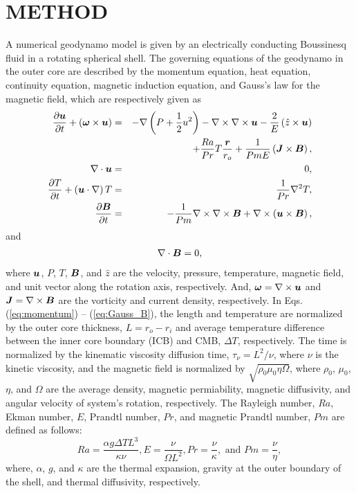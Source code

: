 \section{METHOD}
%
A numerical geodynamo model is given by an electrically conducting Boussinesq fluid in a rotating spherical shell. The governing equations of the geodynamo in the outer core are described by the momentum equation, heat equation, continuity equation, magnetic induction equation, and Gauss's law for the magnetic field, which are respectively given as
%
\begin{eqnarray}
\frac{\partial \bvec{u}}{\partial t} + \left(\bvec{\omega} \times \bvec{u}\right)
 & = & - \nabla \left(P+\frac{1}{2}u^{2} \right) - \nabla \times \nabla \times \bvec{u}
      - \frac{2}{E} \left(\hat{z} \times \bvec{u} \right)
\nonumber \\
 & & + \frac{Ra}{Pr} T \frac{\bvec{r}}{r_{o}}
        + \frac{1}{Pm E} \left(\bvec{J} \times \bvec{B} \right),
\label{eq:momentum} \\
%
\nabla \cdot \bvec{u} & = & 0, 
\label{eq:conservation} \\
%
\frac{\partial T}{\partial t} + \left(\bvec{u} \cdot \nabla \right) T
 & = & \frac{1}{Pr} \nabla^{2} T,
\label{eq:heat} \\
%
 \frac{\partial \bvec{B}}{\partial t}
 & = & -\frac{1}{Pm}  \nabla \times \nabla \times \bvec{B}
       + \nabla \times \left(\bvec{u} \times \bvec{B} \right),
\label{eq:induction}
\end{eqnarray}
%
and
\begin{eqnarray}
\nabla \cdot \mbox{\boldmath$B$} = 0,
\label{eq:Gauss_B}
\end{eqnarray}
%
where $\mbox{\boldmath$u$}$, $P$, $T$, $\mbox{\boldmath$B$}$, and $\hat{z}$ are the velocity, pressure, temperature, magnetic field, and unit vector along the rotation axis, respectively. And, $\mbox{\boldmath$\omega$} = \nabla \times \mbox{\boldmath$u$}$ and $\mbox{\boldmath$J$} = \nabla \times \mbox{\boldmath$B$}$ are the vorticity and current density, respectively.
In Eqs. (\ref{eq:momentum}) – (\ref{eq:Gauss_B}), the length and temperature are normalized by the outer core thickness, $L = r_{o} - r_{i}$ and average temperature difference between the inner core boundary (ICB) and CMB, $\Delta T$, respectively. The time is normalized by the kinematic viscosity diffusion time, $\tau_{\nu}  = L^{2} / \nu$, where $\nu$ is the kinetic viscosity, and the magnetic field is normalized by $\sqrt{\rho_{0} \mu_{0} \eta \Omega}$, where $\rho_{0}$, $\mu_{0}$, $\eta$, and $\Omega$ are the average density, magnetic permiability, magnetic diffusivity, and angular velocity of system's rotation, respectively.
The Rayleigh number, $Ra$, Ekman number, $E$, Prandtl number, $Pr$, and magnetic Prandtl number,  $Pm$ are defined as follows:
%
\begin{equation}
Ra = \displaystyle{ \frac{\alpha g \Delta T L^{3}}{ \kappa \nu} }, 
E  = \displaystyle{ \frac{\nu}{\Omega L^{2}} },
Pr = \displaystyle{ \frac{\nu}{\kappa} }, 
\mbox{ and }
Pm = \displaystyle{ \frac{\nu}{\eta} },
\label{eq:dimensionless}
\end{equation}
%
where, $\alpha$, $g$, and $\kappa$ are the thermal expansion, gravity at the outer boundary of the shell, and thermal diffusivity, respectively.


